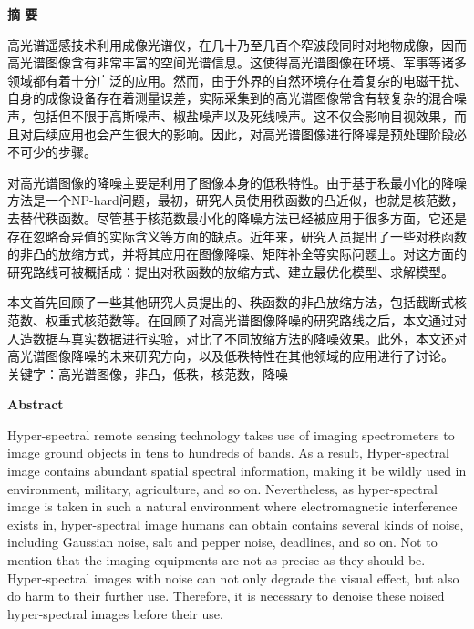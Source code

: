 \documentclass[12pt, a4paper]{article}
\begin{document}

	
\begin{center}
{\Large{\bf{摘 \quad 要}}}
\end{center}
\par 高光谱遥感技术利用成像光谱仪，在几十乃至几百个窄波段同时对地物成像，因而高光谱图像含有非常丰富的空间光谱信息。这使得高光谱图像在环境、军事等诸多领域都有着十分广泛的应用。然而，由于外界的自然环境存在着复杂的电磁干扰、自身的成像设备存在着测量误差，实际采集到的高光谱图像常含有较复杂的混合噪声，包括但不限于高斯噪声、椒盐噪声以及死线噪声。这不仅会影响目视效果，而且对后续应用也会产生很大的影响。因此，对高光谱图像进行降噪是预处理阶段必不可少的步骤。
\par 对高光谱图像的降噪主要是利用了图像本身的低秩特性。由于基于秩最小化的降噪方法是一个NP-hard问题，最初，研究人员使用秩函数的凸近似，也就是核范数，去替代秩函数。尽管基于核范数最小化的降噪方法已经被应用于很多方面，它还是存在忽略奇异值的实际含义等方面的缺点。近年来，研究人员提出了一些对秩函数的非凸的放缩方式，并将其应用在图像降噪、矩阵补全等实际问题上。对这方面的研究路线可被概括成：提出对秩函数的放缩方式、建立最优化模型、求解模型。
\par 本文首先回顾了一些其他研究人员提出的、秩函数的非凸放缩方法，包括截断式核范数、权重式核范数等。在回顾了对高光谱图像降噪的研究路线之后，本文通过对人造数据与真实数据进行实验，对比了不同放缩方法的降噪效果。此外，本文还对高光谱图像降噪的未来研究方向，以及低秩特性在其他领域的应用进行了讨论。
\\
\newline
关键字：高光谱图像，非凸，低秩，核范数，降噪
\newpage
\begin{center}
{\Large{\bf{Abstract}}}
\end{center}
\par Hyper-spectral remote sensing technology takes use of imaging spectrometers to image ground objects in tens to hundreds of bands. As a result, Hyper-spectral image contains abundant spatial spectral information, making it be wildly used in environment, military, agriculture, and so on. Nevertheless, as hyper-spectral image is taken in such a natural environment where electromagnetic interference exists in, hyper-spectral image humans can obtain contains several kinds of noise, including Gaussian noise, salt and pepper noise, deadlines, and so on. Not to mention that the imaging equipments are not as precise as they should be. Hyper-spectral images with noise can not only degrade the visual effect, but also do harm to their further use. Therefore, it is necessary to denoise these noised hyper-spectral images before their use.
\end{document}
